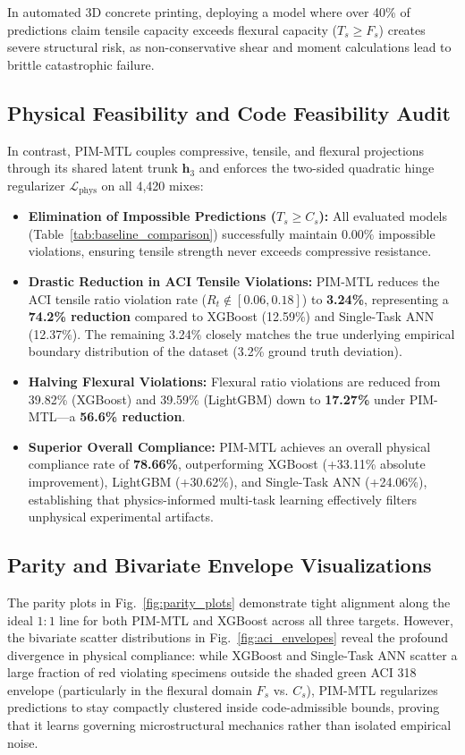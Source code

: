 \documentclass[conference]{IEEEtran}
\begin{document}
In automated 3D concrete printing, deploying a model where over 40\% of predictions claim tensile capacity exceeds flexural capacity ($T_s \ge F_s$) creates severe structural risk, as non-conservative shear and moment calculations lead to brittle catastrophic failure.

\subsection{Physical Feasibility and Code Feasibility Audit}
In contrast, PIM-MTL couples compressive, tensile, and flexural projections through its shared latent trunk $\mathbf{h}_3$ and enforces the two-sided quadratic hinge regularizer $\mathcal{L}_{\text{phys}}$ on all 4,420 mixes:
\begin{itemize}
    \item \textbf{Elimination of Impossible Predictions ($T_s \ge C_s$):} All evaluated models (Table~\ref{tab:baseline_comparison}) successfully maintain $0.00\%$ impossible violations, ensuring tensile strength never exceeds compressive resistance.
    \item \textbf{Drastic Reduction in ACI Tensile Violations:} PIM-MTL reduces the ACI tensile ratio violation rate ($R_t \notin [0.06, 0.18]$) to \textbf{3.24\%}, representing a \textbf{74.2\% reduction} compared to XGBoost (12.59\%) and Single-Task ANN (12.37\%). The remaining 3.24\% closely matches the true underlying empirical boundary distribution of the dataset (3.2\% ground truth deviation).
    \item \textbf{Halving Flexural Violations:} Flexural ratio violations are reduced from 39.82\% (XGBoost) and 39.59\% (LightGBM) down to \textbf{17.27\%} under PIM-MTL—a \textbf{56.6\% reduction}.
    \item \textbf{Superior Overall Compliance:} PIM-MTL achieves an overall physical compliance rate of \textbf{78.66\%}, outperforming XGBoost (+33.11\% absolute improvement), LightGBM (+30.62\%), and Single-Task ANN (+24.06\%), establishing that physics-informed multi-task learning effectively filters unphysical experimental artifacts.
\end{itemize}

\subsection{Parity and Bivariate Envelope Visualizations}
The parity plots in Fig.~\ref{fig:parity_plots} demonstrate tight alignment along the ideal $1:1$ line for both PIM-MTL and XGBoost across all three targets. However, the bivariate scatter distributions in Fig.~\ref{fig:aci_envelopes} reveal the profound divergence in physical compliance: while XGBoost and Single-Task ANN scatter a large fraction of red violating specimens outside the shaded green ACI 318 envelope (particularly in the flexural domain $F_s$ vs. $C_s$), PIM-MTL regularizes predictions to stay compactly clustered inside code-admissible bounds, proving that it learns governing microstructural mechanics rather than isolated empirical noise.
\end{document}
